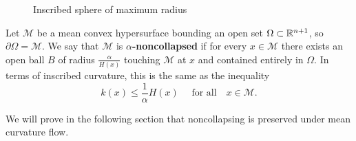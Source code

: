 \begin{comment}
    The inscribed curvature is greater than the largest principal curvature, which can be proved in the following fashion. 
\newpage
\begin{lemma}
    Let $ \mathcal{M} $ be an embedded hypersurface in $ \Rn $ and the inscribed curvature be defined as above. Then for any point $ x \in \mathcal{M} $,
    \[ k(x) \ge \kappa_{n}(x) \]
    where $ \kappa_{1}(x) \le \ldots \le \kappa_{n}(x) $ are the principal curvatures of the hypersurface at the point $ x  $.
\end{lemma}
\begin{proof}
    TO DO
\end{proof}
\end{comment}
\begin{figure}[h]
    \centering
    \caption{Inscribed sphere of maximum radius}
\end{figure}

\begin{defn}
    Let $ \mathcal{M} $ be a mean convex hypersurface bounding an open set $ \Omega \subset \mathbb{R}^{n+1}$, so $ \partial \Omega = \mathcal{M} $. We say that $ \mathcal{M} $ is \textbf{$ \alpha $-noncollapsed}  if for every $ x \in \mathcal{M} $ there exists an open ball $ B $ of radius $ \frac{\alpha}{H(x)} $ touching $ \mathcal{M} $ at $ x $ and contained entirely in $ \Omega $. In terms of inscribed curvature, this is the same as the inequality \begin{equation}
        k(x) \le \frac{1}{\alpha} H(x) \quad \text{ for all} \quad x \in \mathcal{M}.
    \end{equation}
\end{defn}
We will prove in the following section that noncollapsing is preserved under mean curvature flow.
